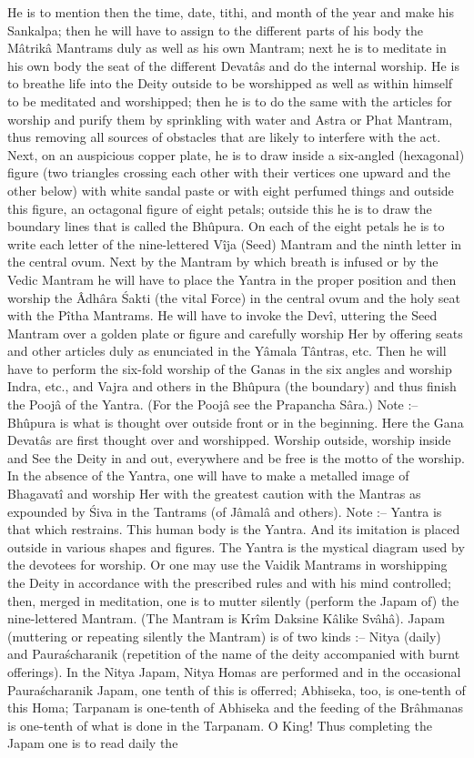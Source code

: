He is to mention then the time, date, tithi, and month of the year and make his Sankalpa; then he will have to assign to the different parts of his body the M\^atrik\^a Mantrams duly as well as his own Mantram; next he is to meditate in his own body the seat of the different Devat\^as and do the internal worship. He is to breathe life into the Deity outside to be worshipped as well as within himself to be meditated and worshipped; then he is to do the same with the articles for worship and purify them by sprinkling with water and Astra or Phat Mantram, thus removing all sources of obstacles that are likely to interfere with the act. Next, on an auspicious copper plate, he is to draw inside a six-angled (hexagonal) figure (two triangles crossing each other with their vertices one upward and the other below) with white sandal paste or with eight perfumed things and outside this figure, an octagonal figure of eight petals; outside this he is to draw the boundary lines that is called the Bh\^upura. On each of the eight petals he is to write each letter of the nine-lettered V\^ija (Seed) Mantram and the ninth letter in the central ovum. Next by the Mantram by which breath is infused or by the Vedic Mantram he will have to place the Yantra in the proper position and then worship the \^Adh\^ara \'Sakti (the vital Force) in the central ovum and the holy seat with the P\^itha Mantrams. He will have to invoke the Dev\^i, uttering the Seed Mantram over a golden plate or figure and carefully worship Her by offering seats and other articles duly as enunciated in the Y\^amala T\^antras, etc. Then he will have to perform the six-fold worship of the Ganas in the six angles and worship Indra, etc., and Vajra and others in the Bh\^upura (the boundary) and thus finish the Pooj\^a of the Yantra. (For the Pooj\^a see the Prapancha S\^ara.) Note :-- Bh\^upura is what is thought over outside front or in the beginning. Here the Gana Devat\^as are first thought over and worshipped. Worship outside, worship inside and See the Deity in and out, everywhere and be free is the motto of the worship. In the absence of the Yantra, one will have to make a metalled image of Bhagavat\^i and worship Her with the greatest caution with the Mantras as expounded by \'Siva in the Tantrams (of J\^amal\^a and others). Note :-- Yantra is that which restrains. This human body is the Yantra. And its imitation is placed outside in various shapes and figures. The Yantra is the mystical diagram used by the devotees for worship. Or one may use the Vaidik Mantrams in worshipping the Deity in accordance with the prescribed rules and with his mind controlled; then, merged in meditation, one is to mutter silently (perform the Japam of) the nine-lettered Mantram. (The Mantram is Kr\^im Daksine K\^alike Sv\^ah\^a). Japam (muttering or repeating silently the Mantram) is of two kinds :-- Nitya (daily) and Paura\'scharanik (repetition of the name of the deity accompanied with burnt offerings). In the Nitya Japam, Nitya Homas are performed and in the occasional Paura\'scharanik Japam, one tenth of this is offerred; Abhiseka, too, is one-tenth of this Homa; Tarpanam is one-tenth of Abhiseka and the feeding of the Br\^ahmanas is one-tenth of what is done in the Tarpanam. O King! Thus completing the Japam one is to read daily the 